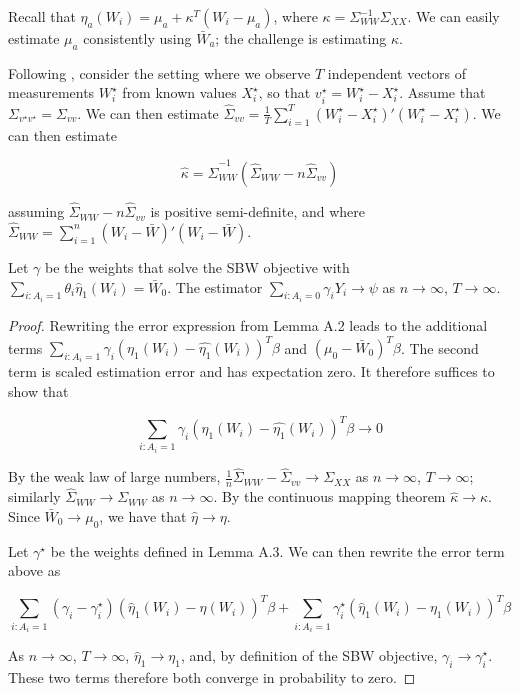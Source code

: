 Recall that $\eta_a(W_i) = \mu_a + \kappa^T(W_i - \mu_a)$, where $\kappa = \Sigma_{WW}^{-1}\Sigma_{XX}$. We can easily estimate $\mu_a$ consistently using $\bar{W}_a$; the challenge is estimating $\kappa$. 

Following \cite{gleser1992importance}, consider the setting where we observe $T$ independent vectors of measurements $W_i^\star$ from known values $X_i^\star$, so that $v_i^\star = W_i^\star - X_i^\star$. Assume that $\Sigma_{v^\star v^\star} = \Sigma_{vv}$. We can then estimate $\hat{\Sigma}_{vv} = \frac{1}{T}\sum_{i=1}^T(W_i^\star - X_i^\star)'(W_i^\star - X_i^\star)$. We can then estimate

$$
\hat{\kappa} = \hat{\Sigma}_{WW}^{-1}(\hat{\Sigma}_{WW} - n\hat{\Sigma}_{vv})
$$

assuming $\hat{\Sigma}_{WW} - n\hat{\Sigma}_{vv}$ is positive semi-definite, and where $\hat{\Sigma}_{WW} = \sum_{i=1}^n (W_i - \bar{W})'(W_i - \bar{W})$. 

\begin{proposition}

Let $\gamma$ be the weights that solve the SBW objective with $\sum_{i: A_i = 1}\theta_i\hat{\eta}_1(W_i) = \bar{W}_0$. The estimator $\sum_{i: A_i = 0}\gamma_iY_i \to \psi$ as $n \to \infty$, $T \to \infty$.

\end{proposition}

\begin{proof}

Rewriting the error expression from Lemma A.2 leads to the additional terms $\sum_{i: A_i = 1}\gamma_i(\eta_1(W_i) - \hat{\eta_1}(W_i))^T\beta$ and $(\mu_0 - \bar{W}_0)^T\beta$. The second term is scaled estimation error and has expectation zero. It therefore suffices to show that 

$$
\sum_{i: A_i = 1}\gamma_i(\eta_1(W_i) - \hat{\eta_1}(W_i))^T\beta \to 0
$$

By the weak law of large numbers, $\frac{1}{n}\hat{\Sigma}_{WW} - \hat{\Sigma}_{vv} \to \Sigma_{XX}$ as $n \to \infty$, $T \to \infty$; similarly $\hat{\Sigma}_{WW} \to \Sigma_{WW}$ as $n \to \infty$. By the continuous mapping theorem $\hat{\kappa} \to \kappa$. Since $\bar{W}_0 \to \mu_0$, we have that $\hat{\eta} \to \eta$. 

Let $\gamma^\star$ be the weights defined in Lemma A.3. We can then rewrite the error term above as

$$
\sum_{i: A_i = 1}(\gamma_i - \gamma_i^\star)(\hat{\eta}_1(W_i) - \eta(W_i))^T\beta + \sum_{i: A_i = 1}\gamma_i^\star(\hat{\eta}_1(W_i) - \eta_1(W_i))^T\beta
$$

As $n \to \infty$, $T \to \infty$, $\hat{\eta}_1 \to \eta_1$, and, by definition of the SBW objective, $\gamma_i \to \gamma_i^\star$. These two terms therefore both converge in probability to zero. 

\end{proof}

